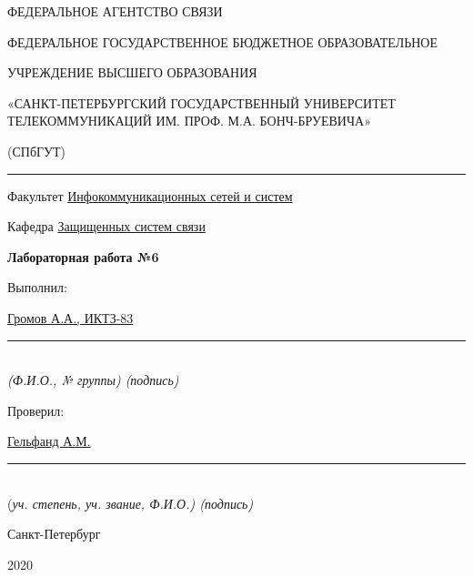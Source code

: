\documentclass[a4paper,14pt]{extarticle}
\begin{document}
    \begin{center}
        \thispagestyle{empty}
        \begin{singlespace}
        ФЕДЕРАЛЬНОЕ АГЕНТСТВО СВЯЗИ

        ФЕДЕРАЛЬНОЕ ГОСУДАРСТВЕННОЕ БЮДЖЕТНОЕ ОБРАЗОВАТЕЛЬНОЕ

        УЧРЕЖДЕНИЕ ВЫСШЕГО ОБРАЗОВАНИЯ

        «САНКТ-ПЕТЕРБУРГСКИЙ ГОСУДАРСТВЕННЫЙ УНИВЕРСИТЕТ ТЕЛЕКОММУНИКАЦИЙ ИМ. ПРОФ. М.А. БОНЧ-БРУЕВИЧА»

        (СПбГУТ)
        \end{singlespace}
        \vspace{-1ex}
        \rule{\textwidth}{0.4pt}
        \vspace{-5ex}

        Факультет \underline{Инфокоммуникационных сетей и систем}

        Кафедра \underline{Защищенных систем связи}
        \vspace{10ex}

        \textbf{Лабораторная работа №6}

    \end{center}
    \vspace{4ex}
    \begin{flushright}
    \parbox{8cm}{
    \begin{flushleft}
        Выполнил:

        \underline{Громов А.А., ИКТЗ-83} \hfill \rule[-0.85ex]{0.1\textwidth}{0.6pt}\\
        \vspace{-1ex}
        \footnotesize \textit{ (Ф.И.О., № группы) \hfill (подпись)} \normalsize

        Проверил:

        \underline{Гельфанд А.М.} \hfill \rule[-0.85ex]{0.1\textwidth}{0.6pt}\\
        \vspace{-1ex}
        (\footnotesize \textit{уч. степень, уч. звание, Ф.И.О.) \hfill (подпись)} \normalsize

    \end{flushleft}
    }
    \end{flushright}
    \begin{center}
        \vfill
        Санкт-Петербург

        2020

        \end{center}
\end{document}

